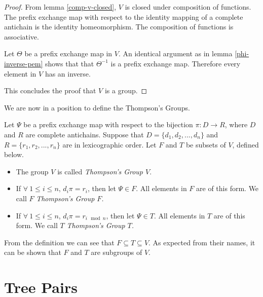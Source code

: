\documentclass[12pt]{amsart}
\begin{document}
        \begin{proof}

            From lemma \ref{comp-v-closed}, $V$ is closed under composition of functions. The prefix exchange map with respect to the identity mapping of a complete antichain is the identity homeomorphism. The composition of functions is associative.
            
            Let $\Theta$ be a prefix exchange map in $V$. An identical argument as in lemma \ref{phi-inverse-pem} shows that that $\Theta^{-1}$ is a prefix exchange map. Therefore every element in $V$ has an inverse.
            
            This concludes the proof that $V$ is a group.
           
        \end{proof}
        
        We are now in a position to define the Thompson's Groups.
        
        \begin{definition}\label{thompsons-groups}
            
            Let $\Psi$ be a prefix exchange map with respect to the bijection $\pi : D \to R$, where $D$ and $R$ are complete antichains. Suppose that $D = \{d_1,d_2,...,d_n\}$ and $R=\{r_1,r_2,...,r_n\}$ are in lexicographic order. Let $F$ and $T$ be subsets of $V$, defined below.
            
            \begin{itemize}
                \item The group $V$ is called \textit{Thompson's Group $V$}.
                \item If $\forall \ 1 \leq i \leq n$, $d_i \pi = r_i$, then let $\Psi \in F$. All elements in $F$ are of this form. We call $F$ \textit{Thompson's Group $F$.}
                \item If $\forall \ 1 \leq i \leq n$, $d_i \pi = r_{i \mod{n}}$, then let $\Psi \in T$. All elements in $T$ are of this form. We call $T$ \textit{Thompson's Group $T$.}
            \end{itemize}
            
        \end{definition}
        
        From the definition we can see that $F \subseteq T \subseteq V$. As expected from their names, it can be shown that $F$ and $T$ are subgroups of $V$.
        
    \section{Tree Pairs}
    
\end{document}

